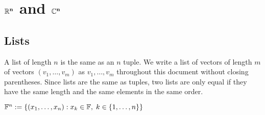 \section{\texorpdfstring{$\mathbf{\mathbb{R}^n}$}{R^n} and \texorpdfstring{$\mathbf{\mathbb{C}^n}$}{C^n}}

\subsection{Lists}
\setcounter{thm}{7}
\begin{mydef} 
  A list of length $n$ is the same as an $n$ tuple. We write a list of vectors of length $m$ of vectors $(v_1, \ldots, v_m)$ as $v_1, \ldots, v_m$ throughout this document without closing parentheses.
  Since lists are the same as tuples, two lists are only equal if they have the same length and the same elements in the same order.
\end{mydef}

\setcounter{thm}{10}
\begin{mydef} 
  $\mathbb{F}^n := \left \{ \left(x_1, \dots, x_n\right) : x_k \in \mathbb{F}, \; k \in \left\{1, \dots, n \right\} \right \}$
\end{mydef}